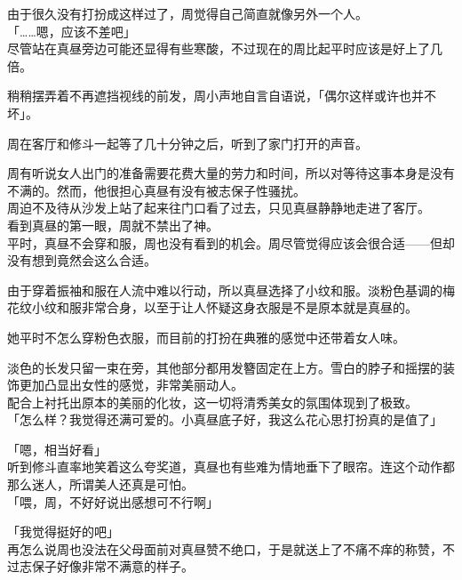 由于很久没有打扮成这样过了，周觉得自己简直就像另外一个人。\\

「……嗯，应该不差吧」\\

尽管站在真昼旁边可能还显得有些寒酸，不过现在的周比起平时应该是好上了几倍。

稍稍摆弄着不再遮挡视线的前发，周小声地自言自语说，「偶尔这样或许也并不坏」。\\

\vspace{2\baselineskip}

周在客厅和修斗一起等了几十分钟之后，听到了家门打开的声音。

周有听说女人出门的准备需要花费大量的劳力和时间，所以对等待这事本身是没有不满的。然而，他很担心真昼有没有被志保子性骚扰。\\

周迫不及待从沙发上站了起来往门口看了过去，只见真昼静静地走进了客厅。\\

看到真昼的第一眼，周就不禁出了神。\\

平时，真昼不会穿和服，周也没有看到的机会。周尽管觉得应该会很合适——但却没有想到竟然会这么合适。

由于穿着振袖和服在人流中难以行动，所以真昼选择了小纹和服。淡粉色基调的梅花纹小纹和服非常合身，以至于让人怀疑这身衣服是不是原本就是真昼的。

她平时不怎么穿粉色衣服，而目前的打扮在典雅的感觉中还带着女人味。

淡色的长发只留一束在旁，其他部分都用发簪固定在上方。雪白的脖子和摇摆的装饰更加凸显出女性的感觉，非常美丽动人。\\

配合上衬托出原本的美丽的化妆，这一切将清秀美女的氛围体现到了极致。\\

「怎么样？我觉得还满可爱的。小真昼底子好，我这么花心思打扮真的是值了」

「嗯，相当好看」\\

听到修斗直率地笑着这么夸奖道，真昼也有些难为情地垂下了眼帘。连这个动作都那么迷人，所谓美人还真是可怕。\\

「喂，周，不好好说出感想可不行啊」

「我觉得挺好的吧」\\

再怎么说周也没法在父母面前对真昼赞不绝口，于是就送上了不痛不痒的称赞，不过志保子好像非常不满意的样子。\\

